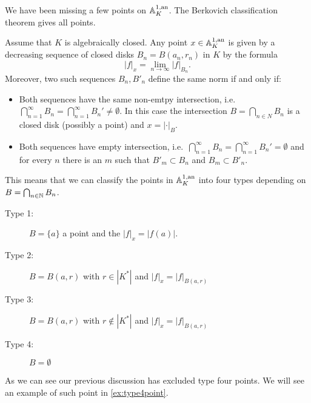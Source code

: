 We have been missing a few points on $\mathbb{A}_K^{1, \text{an}}$. 
The Berkovich classification theorem gives all points. 
\begin{theorem}
	 \label{thm:berkovich_classification}
	Assume that $K$ is algebraically closed. 
	Any point $x \in \mathbb{A}_K^{1,\text{an}}$ is given by a decreasing sequence of closed disks $B_n = B(a_n, r_n)$ in $K$ by the formula \begin{equation}\label{eq:norm_disk_polynomial}
	|f|_x = \lim_{n \to \infty} |f|_{B_n}
	.\end{equation}
	Moreover, two such sequences $B_n, B'_n$ define the same norm if and only if:
	 \begin{itemize}
		\item Both sequences have the same non-emtpy intersection, i.e.\ $\bigcap_{n = 1}^{\infty} B_n = \bigcap_{n = 1}^{\infty} B_n' \ne \emptyset$. 
			In this case the intersection $B = \bigcap_{n \in N} B_n$ is a closed disk (possibly a point) and $x = |\cdot |_B$. 
		\item Both sequences have empty intersection, i.e.\ $\bigcap_{n = 1}^{\infty} B_n = \bigcap_{n = 1}^{\infty} B_n' = \emptyset$  and for every $n$ there is an $m$ such that $B'_m \subset  B_n$  and $B_m \subset  B'_n$.
	\end{itemize}
	This means that we can classify the points in $\mathbb{A} ^{1,\text{an}}_K$ into four types depending on $B = \bigcap_{n \in \mathbb{N}} B_n$. 
	\begin{description}
		\item[Type 1:] $B = \{a\} $ a point and the $|f|_x = |f(a)|$. 
		\item[Type 2:] $B = B(a, r)$ with $r \in |K^* |$ and $|f|_x = |f|_{B(a, r)}$
		\item[Type 3:] $B = B (a, r)$ with $r \not\in |K^*|$ and $|f|_x = |f|_{B(a, r)}$
		\item[Type 4:] $B = \emptyset$
	\end{description}
\end{theorem}
As we can see our previous discussion has excluded type four points. We will see an example of such point in \cref{ex:type4point}. 

